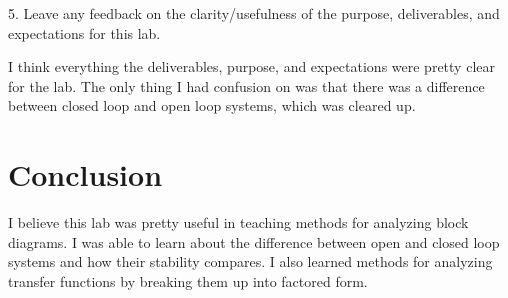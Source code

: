 \documentclass[12pt]{report}
\begin{document}
5. Leave any feedback on the clarity/usefulness of the purpose, deliverables, and 
expectations for this lab.

I think everything the deliverables, purpose, and expectations were pretty clear for the
lab. The only thing I had confusion on was that there was a difference between closed
loop and open loop systems, which was cleared up.

\section{Conclusion}
I believe this lab was pretty useful in teaching methods for analyzing block diagrams.
I was able to learn about the difference between open and closed loop systems and how
their stability compares. I also learned methods for analyzing transfer functions by
breaking them up into factored form.
\end{document}
